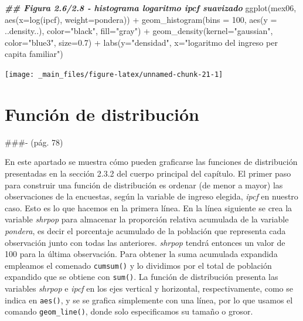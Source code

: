 \documentclass[
]{book}
\newenvironment{Shaded}{\begin{snugshade}}{\end{snugshade}}
\newcommand{\AttributeTok}[1]{\textcolor[rgb]{0.77,0.63,0.00}{#1}}
\newcommand{\DecValTok}[1]{\textcolor[rgb]{0.00,0.00,0.81}{#1}}
\newcommand{\DocumentationTok}[1]{\textcolor[rgb]{0.56,0.35,0.01}{\textbf{\textit{#1}}}}
\newcommand{\FloatTok}[1]{\textcolor[rgb]{0.00,0.00,0.81}{#1}}
\newcommand{\FunctionTok}[1]{\textcolor[rgb]{0.00,0.00,0.00}{#1}}
\newcommand{\NormalTok}[1]{#1}
\newcommand{\SpecialCharTok}[1]{\textcolor[rgb]{0.00,0.00,0.00}{#1}}
\newcommand{\StringTok}[1]{\textcolor[rgb]{0.31,0.60,0.02}{#1}}
\begin{document}
\begin{Shaded}
\begin{Highlighting}[]
\DocumentationTok{\#\# Figura 2.6/2.8 {-} histograma logaritmo ipcf suavizado}
\FunctionTok{ggplot}\NormalTok{(mex06, }
       \FunctionTok{aes}\NormalTok{(}\AttributeTok{x=}\FunctionTok{log}\NormalTok{(ipcf), }\AttributeTok{weight=}\NormalTok{pondera)) }\SpecialCharTok{+} 
  \FunctionTok{geom\_histogram}\NormalTok{(}\AttributeTok{bins =} \DecValTok{100}\NormalTok{, }\FunctionTok{aes}\NormalTok{(}\AttributeTok{y =}\NormalTok{ ..density..), }
                 \AttributeTok{color=}\StringTok{"black"}\NormalTok{, }\AttributeTok{fill=}\StringTok{"gray"}\NormalTok{)  }\SpecialCharTok{+}
  \FunctionTok{geom\_density}\NormalTok{(}\AttributeTok{kernel=}\StringTok{"gaussian"}\NormalTok{, }\AttributeTok{color=}\StringTok{"blue3"}\NormalTok{, }\AttributeTok{size=}\FloatTok{0.7}\NormalTok{) }\SpecialCharTok{+}  
  \FunctionTok{labs}\NormalTok{(}\AttributeTok{y=}\StringTok{"densidad"}\NormalTok{, }\AttributeTok{x=}\StringTok{"logaritmo del ingreso per capita familiar"}\NormalTok{)}
\end{Highlighting}
\end{Shaded}

\texttt{[image: \_main\_files/figure-latex/unnamed-chunk-21-1]}

\hypertarget{funciuxf3n-de-distribuciuxf3n}{%
\section{Función de distribución}\label{funciuxf3n-de-distribuciuxf3n}}

\#\#\#- (pág. 78)

En este apartado se muestra cómo pueden graficarse las funciones de distribución presentadas en la sección 2.3.2 del cuerpo principal del capítulo. El primer paso para construir una función de distribución es ordenar (de menor a mayor) las observaciones de la encuestas, según la variable de ingreso elegida, \emph{ipcf} en nuestro caso. Esto es lo que hacemos en la primera línea. En la línea siguiente se crea la variable \emph{shrpop} para almacenar la proporción relativa acumulada de la variable \emph{pondera}, es decir el porcentaje acumulado de la población que representa cada observación junto con todas las anteriores. \emph{shrpop} tendrá entonces un valor de 100 para la última observación. Para obtener la suma acumulada expandida empleamos el comenado \texttt{cumsum()} y lo dividimos por el total de población expandido que se obtiene con \texttt{sum()}. La función de distribución presenta las variables \emph{shrpop} e \emph{ipcf} en los ejes vertical y horizontal, respectivamente, como se indica en \texttt{aes()}, y se se grafica simplemente con una línea, por lo que usamos el comando \texttt{geom\_line()}, donde solo especificamos su tamaño o grosor.
\end{document}
